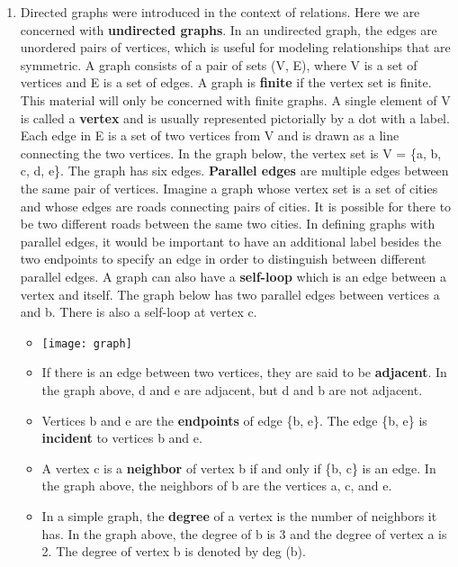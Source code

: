 \documentclass[12pt,a4paper]{article}
\begin{document}
\clearpage
\begin{center}
  \large\textsc{}
\end{center}
\begin{enumerate}
  \item {} Directed graphs were introduced in the context of relations. Here we are concerned with \textbf{undirected graphs}. In an undirected graph, the edges are unordered pairs of vertices, which is useful for modeling relationships that are symmetric.
  A graph consists of a pair of sets (V, E), where V is a set of vertices and E is a set of edges. A graph is \textbf{finite} if the vertex set is finite. This material will only be concerned with finite graphs. A single element of V is called a \textbf{vertex} and is usually represented pictorially by a dot with a label. Each edge in E is a set of two vertices from V and is drawn as a line connecting the two vertices. In the graph below, the vertex set is V = \{a, b, c, d, e\}. The graph has six edges.
  \textbf{Parallel edges} are multiple edges between the same pair of vertices. Imagine a graph whose vertex set is a set of cities and whose edges are roads connecting pairs of cities. It is possible for there to be two different roads between the same two cities. In defining graphs with parallel edges, it would be important to have an additional label besides the two endpoints to specify an edge in order to distinguish between different parallel edges. A graph can also have a \textbf{self-loop} which is an edge between a vertex and itself. The graph below has two parallel edges between vertices a and b. There is also a self-loop at vertex c.
  \begin{itemize}
    \item[] \texttt{[image: graph]}
    \item If there is an edge between two vertices, they are said to be \textbf{adjacent}. In the graph above, d and e are adjacent, but d and b are not adjacent.
    \item Vertices b and e are the \textbf{endpoints} of edge \{b, e\}. The edge \{b, e\} is \textbf{incident} to vertices b and e.
    \item A vertex c is a \textbf{neighbor} of vertex b if and only if \{b, c\} is an edge. In the graph above, the neighbors of b are the vertices a, c, and e.
    \item In a simple graph, the \textbf{degree} of a vertex is the number of neighbors it has. In the graph above, the degree of b is 3 and the degree of vertex a is 2. The degree of vertex b is denoted by deg (b).

\end{itemize}
\end{enumerate}
\end{document}
